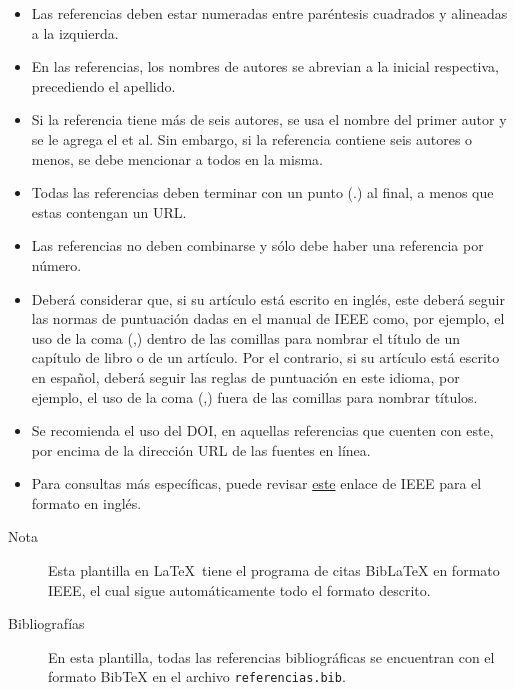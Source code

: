 \documentclass{jornadas}
\begin{document}
\begin{itemize}
    \item Las referencias deben estar numeradas entre paréntesis cuadrados y alineadas a la izquierda. 
    \item En las referencias, los nombres de autores se abrevian a la inicial respectiva, precediendo el apellido. 
    \item Si la referencia tiene más de seis autores, se usa el nombre del primer autor y se le agrega el et al. Sin embargo, si la referencia contiene seis autores o menos, se debe mencionar a todos en la misma. 
    \item Todas las referencias deben terminar con un punto (.) al final, a menos que estas contengan un URL. 
    \item Las referencias no deben combinarse y sólo debe haber una referencia por número. 
    \item Deberá considerar que, si su artículo está escrito en inglés, este deberá seguir las normas de puntuación dadas en el manual de IEEE como, por ejemplo, el uso de la coma (,) dentro de las comillas para nombrar el título de un capítulo de libro o de un artículo. Por el contrario, si su artículo está escrito en español, deberá seguir las reglas de puntuación en este idioma, por ejemplo, el uso de la coma (,) fuera de las comillas para nombrar títulos. 
    \item Se recomienda el uso del DOI, en aquellas referencias que cuenten con este, por encima de la dirección URL de las fuentes en línea. 
    \item Para consultas más específicas, puede revisar \href{https://ieeeauthorcenter.ieee.org/wp-content/uploads/IEEE-Reference-Guide.pdf}{este} enlace de IEEE para el formato en inglés.
\end{itemize}

\begin{description}
    \item[Nota] Esta plantilla en \LaTeX\ tiene el programa de citas BibLaTeX en formato IEEE, el cual sigue automáticamente todo el formato descrito.
    \item[Bibliografías] En esta plantilla, todas las referencias bibliográficas se encuentran con el formato BibTeX en el archivo \texttt{referencias.bib}.
\end{description}

\nolinenumbers

\printbibliography

\licencia

\end{document}
